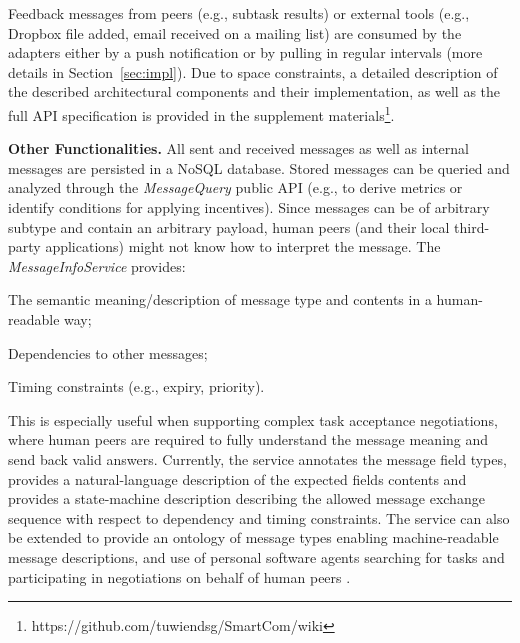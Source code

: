 \documentclass{llncs}
\newcommand{\mdl}{\textsc{SmartCom}}
\begin{document}
    Feedback messages from peers (e.g., subtask results) or external tools (e.g., Dropbox file added, email received on a mailing list) are consumed by the adapters either by a push notification or by pulling in regular intervals (more details in Section~\ref{sec:impl}). 
    Due to space constraints, a detailed description of the described architectural components and their implementation, as well as the full API specification is provided in the supplement materials\footnote{https://github.com/tuwiendsg/SmartCom/wiki}.\addtocounter{footnote}{-1}

  \textbf{Other Functionalities.}
    All sent and received messages as well as internal messages are persisted in a NoSQL database. Stored messages can be queried and analyzed through the \emph{MessageQuery} public API (e.g., to derive metrics or identify conditions for applying incentives).
    Since messages can be of arbitrary subtype and contain an arbitrary payload, human peers (and their local third-party applications) might not know how to interpret the message. The \emph{MessageInfoService} provides:
    \begin{inparaenum}[\itshape a)]
        \item The semantic meaning/description of message type and contents in a human-readable way; 
        \item Dependencies to other messages;
        \item Timing constraints (e.g., expiry, priority).
    \end{inparaenum}
    This is especially useful when supporting complex task acceptance negotiations, where human peers are required to fully understand the message meaning and send back valid answers. 
    Currently, the service annotates the message field types, provides a natural-language description of the expected fields contents and provides a state-machine description describing the allowed message exchange sequence with respect to dependency and timing constraints. The service can also be extended to provide an ontology of message types enabling machine-readable message descriptions, and use of personal software agents searching for tasks and participating in negotiations on behalf of human peers \cite{KobiGal}. 
\end{document}

